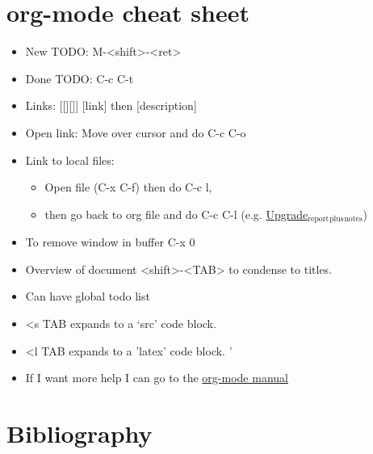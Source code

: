 \documentclass[11pt]{article}
\begin{document}
\section{org-mode cheat sheet}
\label{sec:org2c2f17a}
\begin{itemize}
\item New TODO: M-<shift>-<ret>
\item Done TODO: C-c C-t
\item Links: [[][]] [link] then [description]
\item Open link: Move over cursor and do C-c C-o
\item Link to local files:
\begin{itemize}
\item Open file (C-x C-f) then do C-c l,
\item then go back to org file and do C-c C-l (e.g. \href{file:///home/tigany/Documents/docs/PhDPaperSummary/upgrade\_rep\_plus\_notes.tex}{Upgrade\(_{\text{report}}\)\(_{\text{plus}}\)\(_{\text{notes}}\)})
\end{itemize}
\item To remove window in buffer C-x 0
\item Overview of document <shift>-<TAB> to condense to titles.
\item Can have global todo list
\item <s TAB expands to a ‘src’ code block.
\item <l TAB expands to a 'latex' code block. '
\end{itemize}


\begin{itemize}
\item If I want more help I can go to the \href{https://orgmode.org/manual/}{org-mode manual}
\end{itemize}


\section{Bibliography}
\label{sec:orgd2b81d8}
\label{org53a5793}



\end{document}
